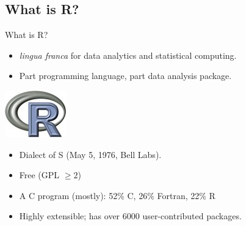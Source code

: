 \subsection{What is R?}
\makesubcontentsslidessec


\begin{frame}
  \begin{block}{What is R?}\pause
  \begin{minipage}{.675\textwidth}
  \begin{itemize}[<+-|alert@+>]
    \item \emph{lingua franca} for data analytics and statistical computing.
    \item Part programming language, part data analysis package.
  \end{itemize}
  \end{minipage}
  \hfill
  \begin{minipage}{.3\textwidth}
    \centering\includegraphics[scale=.85]{../common/pics/Rlogo}
  \end{minipage}
  \begin{itemize}
    \item Dialect of S (May 5, 1976, Bell Labs).
    \item Free (GPL $\geq 2$)
    \item A C program (mostly): 52\% C, 26\% Fortran, 22\% R
    \item Highly extensible; has over 6000 user-contributed packages.
  \end{itemize}
\end{block}
\end{frame}



